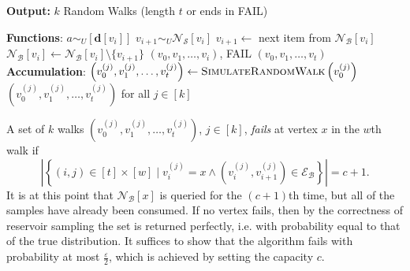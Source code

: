 \documentclass{report}
\newcommand{\algoname}[1]{\textnormal{\textsc{#1}}}
\begin{document}
\begin{algorithm}[htbp]
\begin{flushleft}
        \textbf{Output:} $k$ Random Walks (length $t$ or ends in FAIL)
\end{flushleft}
\begin{flushleft}
\begin{algorithmic}[1]
	\Statex \textbf{Functions}:
				\State $a \sim_U [\mathbf{d}[{v_i}]] $
					\State $v_{i+1} \sim_U \mathcal{N}_\mathcal{S}[v_i]$
				\Else
						\State $v_{i+1} \gets$ next item from $\mathcal{N}_\mathcal{B}[v_i]$
						\State $\mathcal{N}_\mathcal{B}[v_i] \gets \mathcal{N}_\mathcal{B}[v_i] \setminus \{v_{i+1}\}$
					\Else
						\State \Return $(v_0, v_1, \dots, v_i)$, FAIL
					\EndIf
				\EndIf
			\EndFor
			\State \Return $(v_0, v_1, \dots, v_t)$
		\EndFunction
	\Statex \textbf{Accumulation}:
			\State $\left ( v_0^{(j)}, v_1^{(j)}, \dots, v_t^{(j)} \right ) \gets \algoname{SimulateRandomWalk} \left ( v_0^{(j)} \right )$
		\EndParFor
		\State \Return $\left ( v_0^{(j)}, v_1^{(j)}, \dots, v_t^{(j)} \right )$ for all $j \in [k]$
\end{algorithmic}
\end{flushleft}
\end{algorithm}

A set of $k$ walks $\left ( v_0^{(j)}, v_1^{(j)}, \dots, v_t^{(j)} \right )$, $j \in [k]$, \emph{fails} at vertex $x$ in the $w$th walk if 
\begin{equation*}
\left | \left \{ (i,j) \in [t] \times [w] \mid v_i^{(j)} = x 
		\wedge (v_i^{(j)}, v_{i+1}^{(j)}) \in \mathcal{E}_\mathcal{B} \right \} \right | = c + 1.
\end{equation*}
It is at this point that $\mathcal{N}_\mathcal{B}[x]$ is queried for the $(c+1)$th time, but all of the samples have already been consumed.
If no vertex fails, then by the correctness of reservoir sampling the set is returned perfectly, i.e. with probability equal to that of the true distribution.
It suffices to show that the algorithm fails with probability at most $\frac{\varepsilon}{2}$, which is achieved by setting the capacity $c$.
\end{document}
